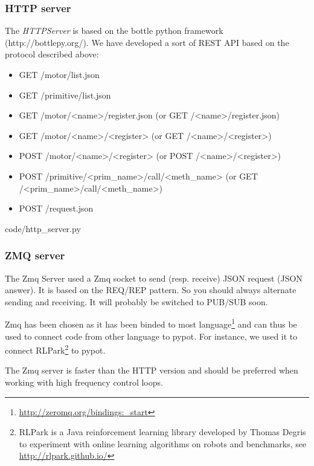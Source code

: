 \subsubsection{HTTP server} %

The \emph{HTTPServer }is based on the bottle python framework (http://bottlepy.org/). We have developed a sort of REST API based on the protocol described above:

\begin{itemize}
    \item GET /motor/list.json
    \item GET /primitive/list.json
    \item GET /motor/<name>/register.json (or GET /<name>/register.json)
    \item GET /motor/<name>/<register> (or GET /<name>/<register>)
    \item POST /motor/<name>/<register> (or POST /<name>/<register>)
    \item POST /primitive/<prim\_name>/call/<meth\_name> (or GET /<prim\_name>/call/<meth\_name>)
    \item POST /request.json
\end{itemize}



    {code/http_server.py}


\subsubsection{ZMQ server} %

The Zmq Server used a Zmq socket to send (resp. receive) JSON request (JSON answer). It is based on the REQ/REP pattern. So you should always alternate sending and receiving. It will probably be switched to PUB/SUB soon.

Zmq has been chosen as it has been binded to most language\footnote{\url{http://zeromq.org/bindings:_start}} and can thus be used to connect code from other language to pypot. For instance, we used it to connect RLPark\footnote{RLPark is a Java reinforcement learning library developed by Thomas Degris to experiment with online learning algorithms on robots and benchmarks, see \url{http://rlpark.github.io/}} to pypot.

The Zmq server is faster than the HTTP version and should be preferred when working with high frequency control loops.

